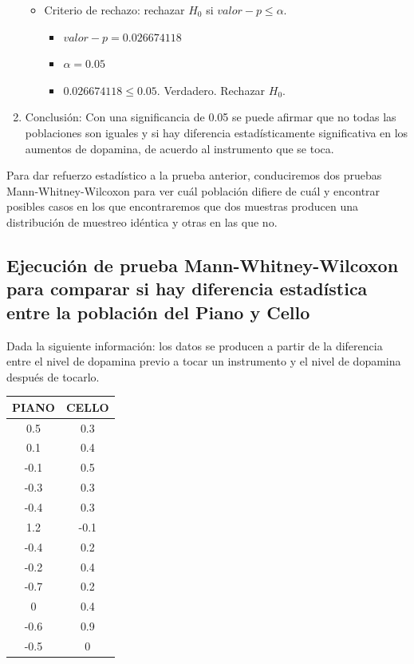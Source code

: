 \begin{enumerate}
        \begin{itemize}
            \item Criterio de rechazo: rechazar $H_0$ si $valor-p \leq \alpha$.
                \begin{itemize}
                    \item $valor-p = 0.026674118$
                    \item $\alpha = 0.05$
                    \item $0.026674118 \leq 0.05$. Verdadero. Rechazar $H_0$. 
                \end{itemize}
        \end{itemize}

    \item Conclusión: Con una significancia de 0.05 se puede afirmar que no todas las poblaciones son iguales y si hay diferencia estadísticamente significativa en los aumentos de dopamina, de acuerdo al instrumento que se toca.
\end{enumerate}

Para dar refuerzo estadístico a la prueba anterior, conduciremos dos pruebas Mann-Whitney-Wilcoxon para ver cuál población difiere de cuál y encontrar posibles casos en los que encontraremos que dos muestras producen una distribución de muestreo idéntica y otras en las que no.


\subsection{Ejecución de prueba Mann-Whitney-Wilcoxon para comparar si hay diferencia estadística entre la población del Piano y Cello}

Dada la siguiente información: los datos se producen a partir de la diferencia entre el nivel de dopamina previo a tocar un instrumento y el nivel de dopamina después de tocarlo.
\begin{center}
    \begin{tabular}{ |cc| }
        \hline
        PIANO & CELLO \\
        \hline
        0.5 & 0.3 \\
        0.1 & 0.4 \\
        -0.1 & 0.5 \\
        -0.3 & 0.3 \\
        -0.4 & 0.3 \\
        1.2 & -0.1 \\
        -0.4 & 0.2 \\
        -0.2 & 0.4 \\
        -0.7 & 0.2 \\
        0 & 0.4 \\
        -0.6 & 0.9 \\
        -0.5 & 0 \\
        \hline
    \end{tabular}
\end{center}

